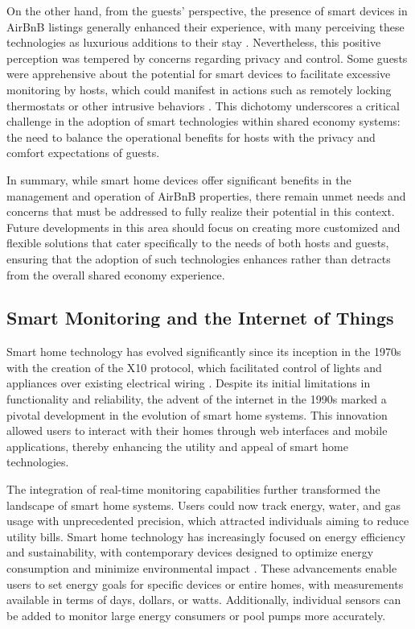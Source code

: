 On the other hand, from the guests' perspective, the presence of smart devices in AirBnB listings generally enhanced 
their experience, with many perceiving these technologies as luxurious additions to their stay \cite{Mare2020}. 
Nevertheless, this positive perception was tempered by concerns regarding privacy and control. Some guests were 
apprehensive about the potential for smart devices to facilitate excessive monitoring by hosts, which could manifest in 
actions such as remotely locking thermostats or other intrusive behaviors \cite{Mare2020}. This dichotomy underscores a 
critical challenge in the adoption of smart technologies within shared economy systems: the need to balance the 
operational benefits for hosts with the privacy and comfort expectations of guests.

In summary, while smart home devices offer significant benefits in the management and operation of AirBnB properties, 
there remain unmet needs and concerns that must be addressed to fully realize their potential in this context. Future 
developments in this area should focus on creating more customized and flexible solutions that cater specifically to the 
needs of both hosts and guests, ensuring that the adoption of such technologies enhances rather than detracts from the 
overall shared economy experience.

\subsection{Smart Monitoring and the Internet of Things}

Smart home technology has evolved significantly since its inception in the 1970s with the creation of the X10 protocol, 
which facilitated control of lights and appliances over existing electrical wiring \cite{Caflisch2023}. Despite its 
initial limitations in functionality and reliability, the advent of the internet in the 1990s marked a pivotal 
development in the evolution of smart home systems. This innovation allowed users to interact with their homes through 
web interfaces and mobile applications, thereby enhancing the utility and appeal of smart home technologies.

The integration of real-time monitoring capabilities further transformed the landscape of smart home systems. Users 
could now track energy, water, and gas usage with unprecedented precision, which attracted individuals aiming to reduce 
utility bills. Smart home technology has increasingly focused on energy efficiency and sustainability, with contemporary 
devices designed to optimize energy consumption and minimize environmental impact \cite{Caflisch2023}. These 
advancements enable users to set energy goals for specific devices or entire homes, with measurements available in terms 
of days, dollars, or watts. Additionally, individual sensors can be added to monitor large energy consumers or pool 
pumps more accurately.


